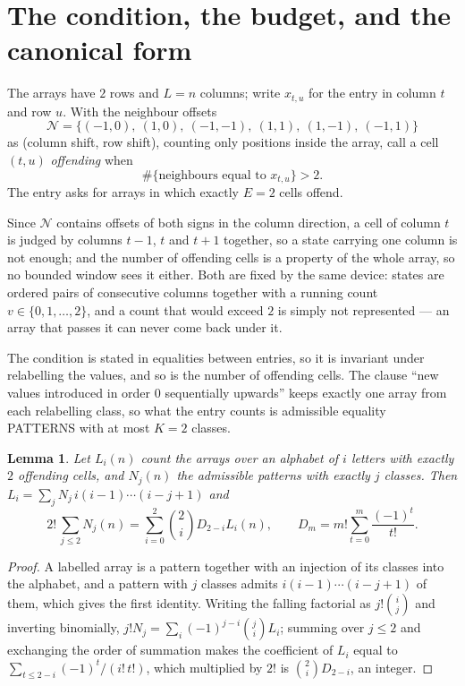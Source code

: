 \documentclass[11pt,a4paper]{article}
\theoremstyle{plain}
\newtheorem{lemma}[theorem]{Lemma}
\theoremstyle{definition}
\begin{document}
\section{The condition, the budget, and the canonical form}

The arrays have $2$ rows and $L=n$ columns; write $x_{t,u}$ for the entry in
column $t$ and row $u$. With the neighbour offsets
\[
\mathcal N=\{(-1,0),\ (1,0),\ (-1,-1),\ (1,1),\ (1,-1),\ (-1,1)\}
\]
as (column shift, row shift), counting only positions inside the array, call a cell
$(t,u)$ \emph{offending} when
\[
\#\{\text{neighbours equal to }x_{t,u}\}>2 .
\]
The entry asks for arrays in which exactly $E=2$ cells offend.

Since $\mathcal N$ contains offsets of both signs in the column direction, a cell of column
$t$ is judged by columns $t-1$, $t$ and $t+1$ together, so a state carrying one column is not
enough; and the number of offending cells is a property of the whole array, so no bounded
window sees it either. Both are fixed by the same device: states are ordered pairs of
consecutive columns together with a running count $v\in\{0,1,\dots,2\}$, and a count that
would exceed $2$ is simply not represented --- an array that passes it can never come back
under it.

The condition is stated in equalities between entries, so it is invariant under relabelling
the values, and so is the number of offending cells. The clause ``new values introduced in
order $0$ sequentially upwards'' keeps exactly one array from each relabelling class, so what
the entry counts is admissible equality PATTERNS with at most $K=2$ classes.

\begin{lemma}\label{lem:inv}
Let $L_i(n)$ count the arrays over an alphabet of $i$ letters with exactly $2$ offending
cells, and $N_j(n)$ the admissible patterns with exactly $j$ classes. Then
$L_i=\sum_j N_j\,i(i-1)\cdots(i-j+1)$ and
\[
2!\,\sum_{j\le2}N_j(n)=\sum_{i=0}^{2}\binom{2}{i}D_{2-i}L_i(n),
\qquad D_m=m!\sum_{t=0}^{m}\frac{(-1)^t}{t!} .
\]
\end{lemma}

\begin{proof}
A labelled array is a pattern together with an injection of its classes into the alphabet,
and a pattern with $j$ classes admits $i(i-1)\cdots(i-j+1)$ of them, which gives the first
identity. Writing the falling factorial as $j!\binom{i}{j}$ and inverting binomially,
$j!N_j=\sum_i(-1)^{j-i}\binom{j}{i}L_i$; summing over $j\le2$ and exchanging the
order of summation makes the coefficient of $L_i$ equal to
$\sum_{t\le2-i}(-1)^t/(i!\,t!)$, which multiplied by $2!$ is
$\binom{2}{i}D_{2-i}$, an integer.
\end{proof}
\end{document}
